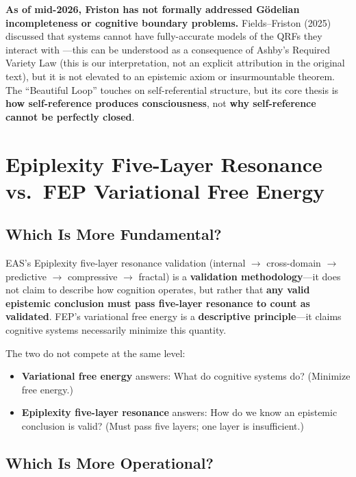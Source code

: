 \documentclass[11pt,a4paper]{article}
\begin{document}
\textbf{As of mid-2026, Friston has not formally addressed G\"{o}delian incompleteness or cognitive boundary problems.} Fields--Friston (2025) discussed that systems cannot have fully-accurate models of the QRFs they interact with \cite{fields2025}---this can be understood as a consequence of Ashby's Required Variety Law (this is our interpretation, not an explicit attribution in the original text), but it is not elevated to an epistemic axiom or insurmountable theorem. The ``Beautiful Loop'' touches on self-referential structure, but its core thesis is \textbf{how self-reference produces consciousness}, not \textbf{why self-reference cannot be perfectly closed}.

\section{Epiplexity Five-Layer Resonance vs.\ FEP Variational Free Energy}

\subsection{Which Is More Fundamental?}

EAS's Epiplexity five-layer resonance validation (internal $\to$ cross-domain $\to$ predictive $\to$ compressive $\to$ fractal) is a \textbf{validation methodology}---it does not claim to describe how cognition operates, but rather that \textbf{any valid epistemic conclusion must pass five-layer resonance to count as validated}. FEP's variational free energy is a \textbf{descriptive principle}---it claims cognitive systems necessarily minimize this quantity.

The two do not compete at the same level:

\begin{itemize}[leftmargin=*]
\item \textbf{Variational free energy} answers: What do cognitive systems do? (Minimize free energy.)
\item \textbf{Epiplexity five-layer resonance} answers: How do we know an epistemic conclusion is valid? (Must pass five layers; one layer is insufficient.)
\end{itemize}

\subsection{Which Is More Operational?}
\end{document}
